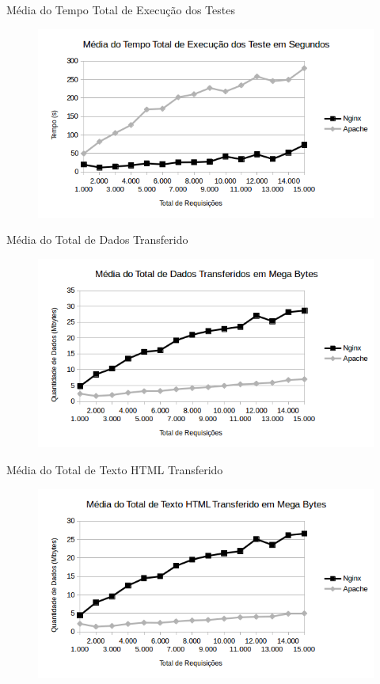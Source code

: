 \begin{frame}{Média do Tempo Total de Execução dos Testes}
	\begin{figure}
		\centering
		\includegraphics[width=1\linewidth]{../graficos/grafico1} 
	\end{figure}
\end{frame}

\begin{frame}{Média do Total de Dados Transferido}
	\begin{figure}
		\centering
		\includegraphics[width=1\linewidth]{../graficos/grafico2} 
	\end{figure}
\end{frame}

\begin{frame}{Média do Total de Texto HTML Transferido}
	\begin{figure}
		\centering
		\includegraphics[width=1\linewidth]{../graficos/grafico3} 
	\end{figure}
\end{frame}

